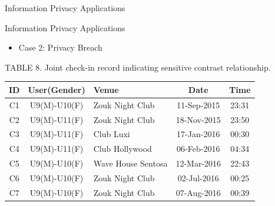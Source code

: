 \documentclass[
 size=14pt,
 paper=smartboard,  %
 mode=present, 		%
 display=slides, 	%
 style=tuliplab,  	%
 pauseslide,
 fleqn,leqno]{powerdot}
\begin{document}
\begin{slide}[toc=,bm=]{Information Privacy Applications}

\end{slide}





\begin{slide}[toc=,bm=]{Information Privacy Applications}
\begin{itemize}
\item
Case 2: Privacy Breach
\end{itemize}
\begin{table}
	\setlength{\abovecaptionskip}{0pt}
	\setlength{\belowcaptionskip}{12pt}
	\centering
	TABLE 8. Joint check-in record indicating sensitive contrast relationship\protect\footnotemark[1].\\[15pt]
	\begin{tabular}{c|c|l|c|c}	
	\toprule	
	ID  				&  	\textbf{User(Gender)}		& 		\textbf{Venue} 		& 	\textbf{Date} 		&	\textbf{Time}	\\
	\midrule
	C{\footnotesize1}	&	U{\footnotesize9}(M)-U{\footnotesize10}(F)	&	Zouk Night Club		&	11-Sep-2015	&	23:31\\
	C{\footnotesize2}	&	U{\footnotesize9}(M)-U{\footnotesize11}(F)	&	Zouk Night Club		&	18-Nov-2015	&	23:50\\
	C{\footnotesize3}	&	U{\footnotesize9}(M)-U{\footnotesize11}(F)	&	Club Luxi				&	17-Jan-2016	&	00:30\\
	C{\footnotesize4}	&	U{\footnotesize9}(M)-U{\footnotesize11}(F)	&	Club Hollywood			&	06-Feb-2016	&	04:34\\
	C{\footnotesize5}	&	U{\footnotesize9}(M)-U{\footnotesize10}(F)	&	Wave House Sentosa	&	12-Mar-2016	&	22:43\\
	C{\footnotesize6}	&	U{\footnotesize9}(M)-U{\footnotesize10}(F)	&	Zouk Night Club		&	02-Jul-2016	&	00:25\\
	C{\footnotesize7}	&	U{\footnotesize9}(M)-U{\footnotesize10}(F)	&	Zouk Night Club		&	07-Aug-2016	&	00:39\\
	\bottomrule
	\end{tabular}
\end{table}



\end{slide}
\end{document}
